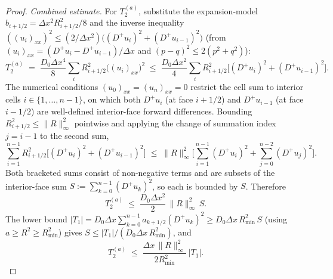 \documentclass[11pt]{article}
\begin{document}
\begin{proof}
    \emph{Combined estimate.}
    For $T_2^{(a)}$, substitute the expansion-model $b_{i+1/2} = \Delta x^2 R_{i+1/2}^2/8$ and the inverse inequality $((u_i)_{xx})^2 \leq (2/\Delta x^2)\big((D^+ u_i)^2 + (D^+ u_{i-1})^2\big)$ (from $(u_i)_{xx} = (D^+ u_i - D^+ u_{i-1})/\Delta x$ and $(p-q)^2 \le 2(p^2 + q^2)$):
    \begin{equation}
        T_2^{(a)} \;=\; \frac{D_0 \Delta x^4}{8} \sum_i R_{i+1/2}^2 \big((u_i)_{xx}\big)^2 \;\leq\; \frac{D_0 \Delta x^2}{4} \sum_i R_{i+1/2}^2 \big[(D^+ u_i)^2 + (D^+ u_{i-1})^2\big].
    \end{equation}
    The numerical conditions $(u_0)_{xx} = (u_n)_{xx} = 0$ restrict the cell sum to interior cells $i \in \{1, \ldots, n-1\}$, on which both $D^+ u_i$ (at face $i + 1/2$) and $D^+ u_{i-1}$ (at face $i - 1/2$) are well-defined interior-face forward differences. Bounding $R_{i+1/2}^2 \leq \|R\|_\infty^2$ pointwise and applying the change of summation index $j = i-1$ to the second sum,
    \begin{equation}
        \sum_{i=1}^{n-1} R_{i+1/2}^2 \big[(D^+ u_i)^2 + (D^+ u_{i-1})^2\big] \;\leq\; \|R\|_\infty^2 \bigg[ \sum_{i=1}^{n-1} (D^+ u_i)^2 + \sum_{j=0}^{n-2} (D^+ u_j)^2 \bigg].
    \end{equation}
    Both bracketed sums consist of non-negative terms and are subsets of the interior-face sum $S := \sum_{k=0}^{n-1}(D^+ u_k)^2$, so each is bounded by $S$. Therefore
    \begin{equation}
        T_2^{(a)} \;\leq\; \frac{D_0 \Delta x^2}{2}\, \|R\|_\infty^2\, S. \label{eq:t2a-bound-clean}
    \end{equation}
    The lower bound $|T_1| = D_0 \Delta x \sum_{k=0}^{n-1} a_{k+1/2}(D^+ u_k)^2 \geq D_0 \Delta x\, R_{\min}^2\, S$ (using $a \geq R^2 \geq R_{\min}^2$) gives $S \leq |T_1|/(D_0 \Delta x\, R_{\min}^2)$, and
    \begin{equation}
        T_2^{(a)} \;\leq\; \frac{\Delta x\, \|R\|_\infty^2}{2 R_{\min}^2}\, |T_1|.
    \end{equation}


\end{proof}
\end{document}
